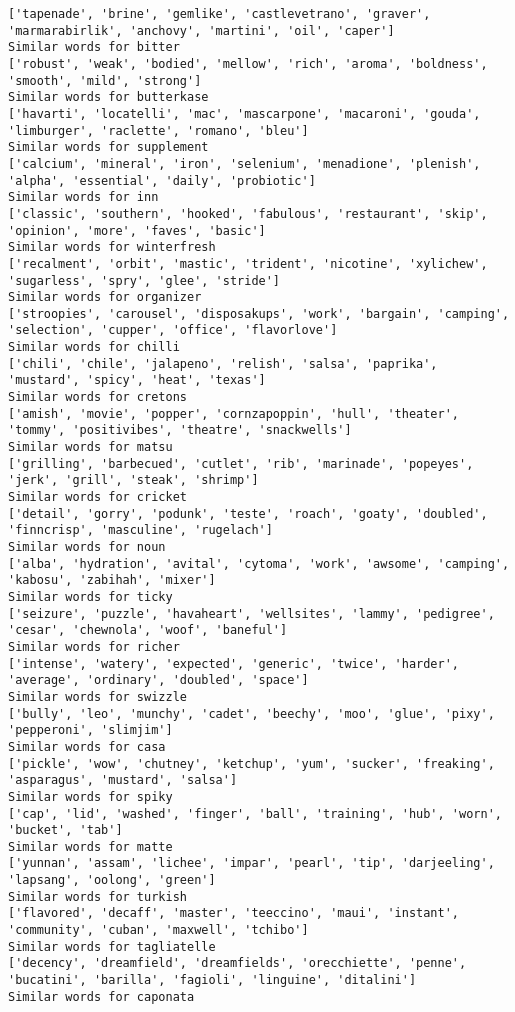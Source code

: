 \documentclass[11pt]{article}
\begin{document}
\begin{Verbatim}[commandchars=\\\{\}]
['tapenade', 'brine', 'gemlike', 'castlevetrano', 'graver', 'marmarabirlik', 'anchovy', 'martini', 'oil', 'caper']
Similar words for bitter
['robust', 'weak', 'bodied', 'mellow', 'rich', 'aroma', 'boldness', 'smooth', 'mild', 'strong']
Similar words for butterkase
['havarti', 'locatelli', 'mac', 'mascarpone', 'macaroni', 'gouda', 'limburger', 'raclette', 'romano', 'bleu']
Similar words for supplement
['calcium', 'mineral', 'iron', 'selenium', 'menadione', 'plenish', 'alpha', 'essential', 'daily', 'probiotic']
Similar words for inn
['classic', 'southern', 'hooked', 'fabulous', 'restaurant', 'skip', 'opinion', 'more', 'faves', 'basic']
Similar words for winterfresh
['recalment', 'orbit', 'mastic', 'trident', 'nicotine', 'xylichew', 'sugarless', 'spry', 'glee', 'stride']
Similar words for organizer
['stroopies', 'carousel', 'disposakups', 'work', 'bargain', 'camping', 'selection', 'cupper', 'office', 'flavorlove']
Similar words for chilli
['chili', 'chile', 'jalapeno', 'relish', 'salsa', 'paprika', 'mustard', 'spicy', 'heat', 'texas']
Similar words for cretons
['amish', 'movie', 'popper', 'cornzapoppin', 'hull', 'theater', 'tommy', 'positivibes', 'theatre', 'snackwells']
Similar words for matsu
['grilling', 'barbecued', 'cutlet', 'rib', 'marinade', 'popeyes', 'jerk', 'grill', 'steak', 'shrimp']
Similar words for cricket
['detail', 'gorry', 'podunk', 'teste', 'roach', 'goaty', 'doubled', 'finncrisp', 'masculine', 'rugelach']
Similar words for noun
['alba', 'hydration', 'avital', 'cytoma', 'work', 'awsome', 'camping', 'kabosu', 'zabihah', 'mixer']
Similar words for ticky
['seizure', 'puzzle', 'havaheart', 'wellsites', 'lammy', 'pedigree', 'cesar', 'chewnola', 'woof', 'baneful']
Similar words for richer
['intense', 'watery', 'expected', 'generic', 'twice', 'harder', 'average', 'ordinary', 'doubled', 'space']
Similar words for swizzle
['bully', 'leo', 'munchy', 'cadet', 'beechy', 'moo', 'glue', 'pixy', 'pepperoni', 'slimjim']
Similar words for casa
['pickle', 'wow', 'chutney', 'ketchup', 'yum', 'sucker', 'freaking', 'asparagus', 'mustard', 'salsa']
Similar words for spiky
['cap', 'lid', 'washed', 'finger', 'ball', 'training', 'hub', 'worn', 'bucket', 'tab']
Similar words for matte
['yunnan', 'assam', 'lichee', 'impar', 'pearl', 'tip', 'darjeeling', 'lapsang', 'oolong', 'green']
Similar words for turkish
['flavored', 'decaff', 'master', 'teeccino', 'maui', 'instant', 'community', 'cuban', 'maxwell', 'tchibo']
Similar words for tagliatelle
['decency', 'dreamfield', 'dreamfields', 'orecchiette', 'penne', 'bucatini', 'barilla', 'fagioli', 'linguine', 'ditalini']
Similar words for caponata

\end{Verbatim}
\end{document}
